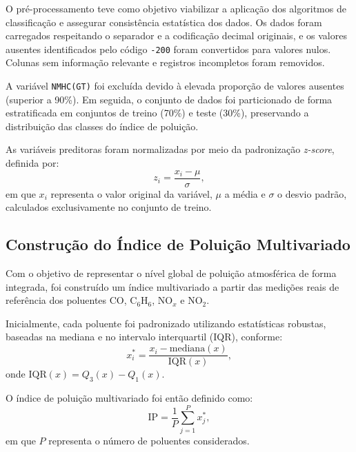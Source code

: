 O pré-processamento teve como objetivo viabilizar a aplicação dos algoritmos de classificação e assegurar consistência estatística dos dados. Os dados foram carregados respeitando o separador e a codificação decimal originais, e os valores ausentes identificados pelo código \texttt{-200} foram convertidos para valores nulos. Colunas sem informação relevante e registros incompletos foram removidos.

A variável \texttt{NMHC(GT)} foi excluída devido à elevada proporção de valores ausentes (superior a 90\%). Em seguida, o conjunto de dados foi particionado de forma estratificada em conjuntos de treino (70\%) e teste (30\%), preservando a distribuição das classes do índice de poluição.

As variáveis preditoras foram normalizadas por meio da padronização \textit{z-score}, definida por:
\begin{equation}
z_i = \frac{x_i - \mu}{\sigma},
\end{equation}
em que $x_i$ representa o valor original da variável, $\mu$ a média e $\sigma$ o desvio padrão, calculados exclusivamente no conjunto de treino.

\subsection{Construção do Índice de Poluição Multivariado}
\label{subsec:indice_poluicao}

Com o objetivo de representar o nível global de poluição atmosférica de forma integrada, foi construído um índice multivariado a partir das medições reais de referência dos poluentes CO, C$_6$H$_6$, NO$_x$ e NO$_2$.

Inicialmente, cada poluente foi padronizado utilizando estatísticas robustas, baseadas na mediana e no intervalo interquartil (IQR), conforme:
\begin{equation}
x^{*}_{i} = \frac{x_i - \text{mediana}(x)}{\text{IQR}(x)},
\end{equation}
onde $\text{IQR}(x) = Q_3(x) - Q_1(x)$.

O índice de poluição multivariado foi então definido como:
\begin{equation}
\text{IP} = \frac{1}{P} \sum_{j=1}^{P} x^{*}_{j},
\end{equation}
em que $P$ representa o número de poluentes considerados.


